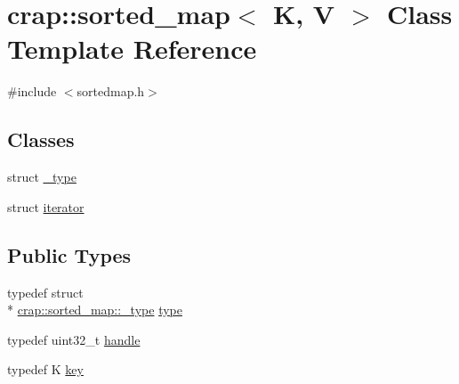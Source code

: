 \hypertarget{classcrap_1_1sorted__map}{\section{crap\+:\+:sorted\+\_\+map$<$ K, V $>$ Class Template Reference}
\label{classcrap_1_1sorted__map}
}


{\ttfamily \#include $<$sortedmap.\+h$>$}

\subsection*{Classes}
\begin{DoxyCompactItemize}
\item 
struct \hyperlink{structcrap_1_1sorted__map_1_1__type}{\+\_\+type}
\item 
struct \hyperlink{structcrap_1_1sorted__map_1_1iterator}{iterator}
\end{DoxyCompactItemize}
\subsection*{Public Types}
\begin{DoxyCompactItemize}
\item 
typedef struct \\*
\hyperlink{structcrap_1_1sorted__map_1_1__type}{crap\+::sorted\+\_\+map\+::\+\_\+type} \hyperlink{classcrap_1_1sorted__map_a53d3509992e52b87de809a99bf246551}{type}
\item 
typedef uint32\+\_\+t \hyperlink{classcrap_1_1sorted__map_a741a562ba6e22dc1a20e103e75619189}{handle}
\item 
typedef K \hyperlink{classcrap_1_1sorted__map_a7b1a41d7af597537a793fb19e307716d}{key}
\end{DoxyCompactItemize}
